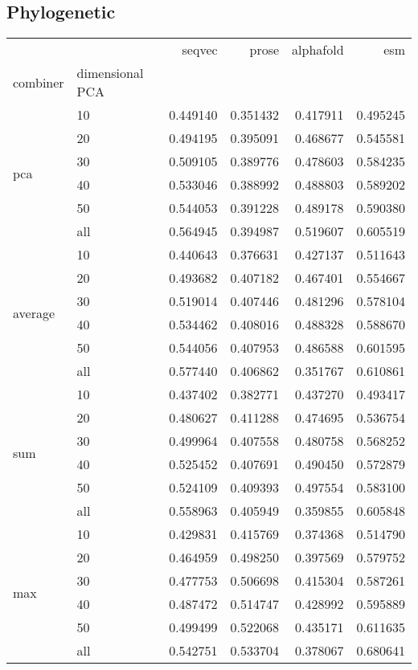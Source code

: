 \documentclass[12pt, letterpaper, twocolumn]{article}
\begin{document}
\subsection{Phylogenetic}



\begin{table*}[hbt]
    \begin{tabular}{llrrrr}
        \toprule
         &  & seqvec & prose & alphafold & esm \\
        combiner & dimensional PCA &  &  &  &  \\
        \midrule
        \multirow[t]{6}{*}{pca} & 10 & 0.449140 & 0.351432 & 0.417911 & 0.495245 \\
         & 20 & 0.494195 & 0.395091 & 0.468677 & 0.545581 \\
         & 30 & 0.509105 & 0.389776 & 0.478603 & 0.584235 \\
         & 40 & 0.533046 & 0.388992 & 0.488803 & 0.589202 \\
         & 50 & 0.544053 & 0.391228 & 0.489178 & 0.590380 \\
         & all & 0.564945 & 0.394987 & 0.519607 & 0.605519 \\
        \cline{1-6}
        \multirow[t]{6}{*}{average} & 10 & 0.440643 & 0.376631 & 0.427137 & 0.511643 \\
         & 20 & 0.493682 & 0.407182 & 0.467401 & 0.554667 \\
         & 30 & 0.519014 & 0.407446 & 0.481296 & 0.578104 \\
         & 40 & 0.534462 & 0.408016 & 0.488328 & 0.588670 \\
         & 50 & 0.544056 & 0.407953 & 0.486588 & 0.601595 \\
         & all & 0.577440 & 0.406862 & 0.351767 & 0.610861 \\
        \cline{1-6}
        \multirow[t]{6}{*}{sum} & 10 & 0.437402 & 0.382771 & 0.437270 & 0.493417 \\
         & 20 & 0.480627 & 0.411288 & 0.474695 & 0.536754 \\
         & 30 & 0.499964 & 0.407558 & 0.480758 & 0.568252 \\
         & 40 & 0.525452 & 0.407691 & 0.490450 & 0.572879 \\
         & 50 & 0.524109 & 0.409393 & 0.497554 & 0.583100 \\
         & all & 0.558963 & 0.405949 & 0.359855 & 0.605848 \\
        \cline{1-6}
        \multirow[t]{6}{*}{max} & 10 & 0.429831 & 0.415769 & 0.374368 & 0.514790 \\
         & 20 & 0.464959 & 0.498250 & 0.397569 & 0.579752 \\
         & 30 & 0.477753 & 0.506698 & 0.415304 & 0.587261 \\
         & 40 & 0.487472 & 0.514747 & 0.428992 & 0.595889 \\
         & 50 & 0.499499 & 0.522068 & 0.435171 & 0.611635 \\
         & all & 0.542751 & 0.533704 & 0.378067 & 0.680641 \\
        \cline{1-6}
        \bottomrule
        \end{tabular}
             

\end{table*}
\end{document}
